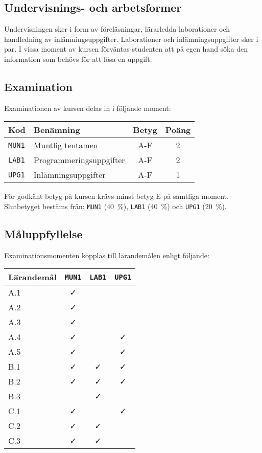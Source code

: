 \subsection*{Undervisnings- och
arbetsformer}

Undervisningen sker i form av föreläsningar, lärarledda laborationer och
handledning av inlämningsuppgifter. Laborationer och inlämningsuppgifter
sker i par. I vissa moment av kursen förväntas studenten att på egen
hand söka den information som behövs för att lösa en uppgift.

\subsection*{Examination}

Examinationen av kursen delas in i följande moment:

\begin{longtable}[]{@{}llcc@{}}
\toprule
\textsf{Kod} & \textsf{Benämning} & \textsf{Betyg} & \textsf{Poäng}\tabularnewline
\midrule
\endhead
\texttt{MUN1} & Muntlig tentamen & A-F & 2\tabularnewline
\texttt{LAB1} & Programmeringsuppgifter & A-F & 2\tabularnewline
\texttt{UPG1} & Inlämningsuppgifter & A-F & 1\tabularnewline
\bottomrule
\end{longtable}

För godkänt betyg på kursen krävs minst betyg E på samtliga moment.
Slutbetyget bestäms från: \texttt{MUN1} (40~\%), \texttt{LAB1} (40~\%) och \texttt{UPG1} (20~\%).

\subsection*{Måluppfyllelse}

Examinationsmomenten kopplas till lärandemålen enligt följande:

\begin{longtable}[]{@{}lccc@{}}
\toprule
\textsf{Lärandemål} & \texttt{MUN1} & \texttt{LAB1} & \texttt{UPG1}\tabularnewline
\midrule
\endhead
A.1 & \faCheck & &\tabularnewline
A.2 & \faCheck & &\tabularnewline
A.3 & \faCheck & &\tabularnewline
A.4 & \faCheck & & \faCheck\tabularnewline
A.5 & \faCheck & & \faCheck\tabularnewline
B.1 & \faCheck & \faCheck & \faCheck\tabularnewline
B.2 & \faCheck & \faCheck & \faCheck\tabularnewline
B.3 & & \faCheck &\tabularnewline
C.1 & \faCheck & & \faCheck\tabularnewline
C.2 & \faCheck & \faCheck &\tabularnewline
C.3 & \faCheck & \faCheck &\tabularnewline
\bottomrule
\end{longtable}

